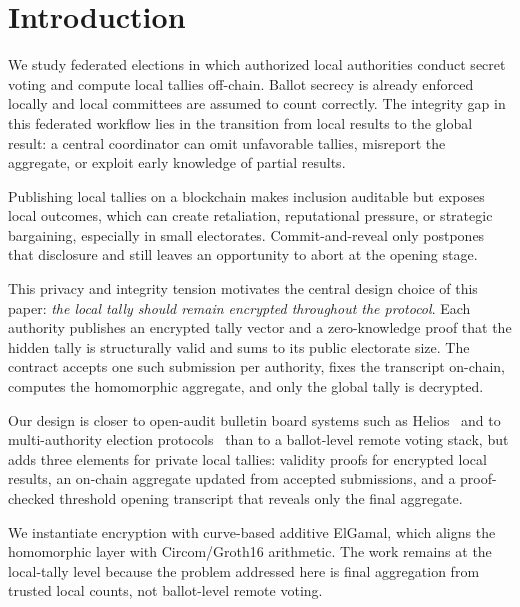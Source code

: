 
\section{Introduction}

We study federated elections in which authorized local authorities conduct
secret voting and compute local tallies off-chain. Ballot secrecy is
already enforced locally and local committees are assumed to count correctly.
The integrity gap in this federated workflow lies in the transition from local
results to the global result: a central coordinator can omit unfavorable
tallies, misreport the aggregate, or exploit early knowledge of partial results.

Publishing local tallies on a blockchain makes inclusion auditable but exposes
local outcomes, which can create retaliation, reputational pressure, or
strategic bargaining, especially in small electorates. Commit-and-reveal only
postpones that disclosure and still leaves an opportunity to abort at the
opening stage.

This privacy and integrity tension motivates the central design choice of this
paper: \emph{the local tally should remain encrypted throughout the protocol}.
Each authority publishes an encrypted tally vector and a zero-knowledge proof
that the hidden tally is structurally valid and sums to its public electorate
size. The contract accepts one such submission per authority, fixes the
transcript on-chain, computes the homomorphic aggregate, and only the global
tally is decrypted.

Our design is closer to open-audit bulletin board systems such as
Helios~\cite{USENIX:Adida08} and to multi-authority election
protocols~\cite{EC:CraGenSch97} than to a ballot-level remote voting stack, but
adds three elements for private local tallies: validity proofs for encrypted
local results, an on-chain aggregate updated from accepted submissions, and a
proof-checked threshold opening transcript that reveals only the final
aggregate.

We instantiate encryption with curve-based additive ElGamal, which aligns the
homomorphic layer with Circom/Groth16 arithmetic. The work remains at the
local-tally level because the problem addressed here is final aggregation from
trusted local counts, not ballot-level remote voting.
